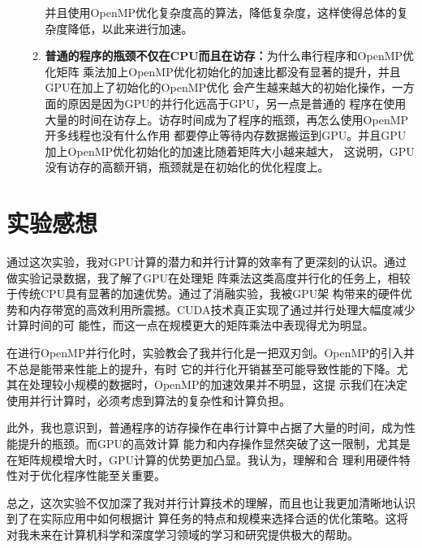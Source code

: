 \documentclass{article}
\begin{document}
\begin{enumerate}
\begin{enumerate}
        并且使用OpenMP优化复杂度高的算法，降低复杂度，这样使得总体的复杂度降低，以此来进行加速。
        \item \textbf{普通的程序的瓶颈不仅在CPU而且在访存：}为什么串行程序和OpenMP优化矩阵
        乘法加上OpenMP优化初始化的加速比都没有显著的提升，并且GPU在加上了初始化的OpenMP优化
        会产生越来越大的初始化操作，一方面的原因是因为GPU的并行化远高于GPU，另一点是普通的
        程序在使用大量的时间在访存上。访存时间成为了程序的瓶颈，再怎么使用OpenMP开多线程也没有什么作用
        都要停止等待内存数据搬运到GPU。并且GPU加上OpenMP优化初始化的加速比随着矩阵大小越来越大，
        这说明，GPU没有访存的高额开销，瓶颈就是在初始化的优化程度上。
      \end{enumerate}
\end{enumerate}

\section{实验感想}
通过这次实验，我对GPU计算的潜力和并行计算的效率有了更深刻的认识。通过做实验记录数据，我了解了GPU在处理矩
阵乘法这类高度并行化的任务上，相较于传统CPU具有显著的加速优势。通过了消融实验，我被GPU架
构带来的硬件优势和内存带宽的高效利用所震撼。CUDA技术真正实现了通过并行处理大幅度减少计算时间的可
能性，而这一点在规模更大的矩阵乘法中表现得尤为明显。

在进行OpenMP并行化时，实验教会了我并行化是一把双刃剑。OpenMP的引入并不总是能带来性能上的提升，有时
它的并行化开销甚至可能导致性能的下降。尤其在处理较小规模的数据时，OpenMP的加速效果并不明显，这提
示我们在决定使用并行计算时，必须考虑到算法的复杂性和计算负担。

此外，我也意识到，普通程序的访存操作在串行计算中占据了大量的时间，成为性能提升的瓶颈。而GPU的高效计算
能力和内存操作显然突破了这一限制，尤其是在矩阵规模增大时，GPU计算的优势更加凸显。我认为，理解和合
理利用硬件特性对于优化程序性能至关重要。

总之，这次实验不仅加深了我对并行计算技术的理解，而且也让我更加清晰地认识到了在实际应用中如何根据计
算任务的特点和规模来选择合适的优化策略。这将对我未来在计算机科学和深度学习领域的学习和研究提供极大的帮助。
\newpage
\appendix
\end{document}
